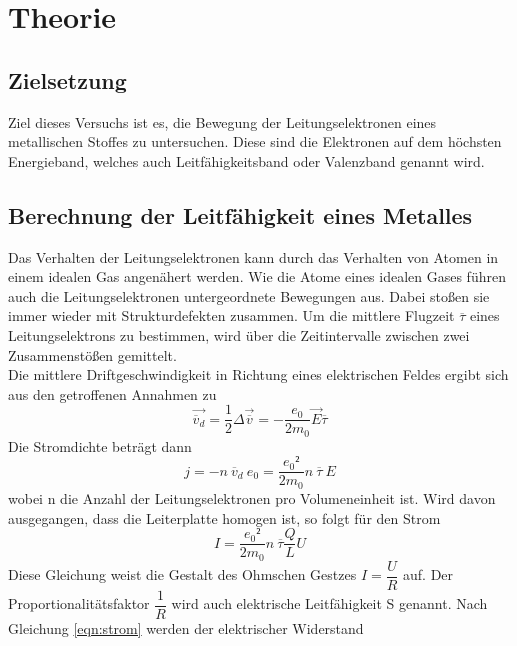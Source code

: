 \section{Theorie}
\label{sec:Theorie}

\subsection{Zielsetzung}
    Ziel dieses Versuchs ist es, die Bewegung der Leitungselektronen eines metallischen Stoffes
    zu untersuchen. Diese sind die Elektronen auf dem höchsten Energieband, welches auch 
    Leitfähigkeitsband oder Valenzband genannt wird. 
\subsection{Berechnung der Leitfähigkeit eines Metalles}
    Das Verhalten der Leitungselektronen kann durch das Verhalten von Atomen in einem
    idealen Gas angenähert werden. Wie die Atome eines idealen Gases führen auch 
    die Leitungselektronen untergeordnete Bewegungen aus. Dabei stoßen sie 
    immer wieder mit Strukturdefekten zusammen.
    Um die mittlere Flugzeit $\overline \tau$ eines Leitungselektrons zu bestimmen, 
    wird über die Zeitintervalle zwischen zwei Zusammenstößen gemittelt.\\
    Die mittlere Driftgeschwindigkeit 
    in Richtung eines elektrischen Feldes ergibt sich aus den getroffenen Annahmen zu 
    \begin{equation}
        \label{eqn:driftv}
        \vec{\overline v_d} = \dfrac{1}{2} \Delta \vec{\overline v} = -\dfrac{e_0}{2 m_0} \vec E \overline \tau
    \end{equation}
    Die Stromdichte beträgt dann
    \begin{equation}
        \label{eqn:stromdichte}
        j = - n\ \overline v_d \ e_0 = \dfrac{e_0²}{2 m_0}n\ \overline \tau \ E
    \end{equation}
    wobei n die Anzahl der Leitungselektronen pro Volumeneinheit ist. Wird davon ausgegangen, 
    dass die Leiterplatte homogen ist, so folgt für den Strom 
    \begin{equation}
        \label{eqn:strom}
        I=\dfrac{e_0²}{2 m_0}n\ \overline \tau \dfrac{Q}{L}U
    \end{equation}
    Diese Gleichung weist die Gestalt des Ohmschen Gestzes $I=\dfrac{U}{R}$ auf. 
    Der Proportionalitätsfaktor $\dfrac{1}{R}$ wird auch elektrische Leitfähigkeit S 
    genannt. Nach Gleichung \eqref{eqn:strom} werden der elektrischer Widerstand 
